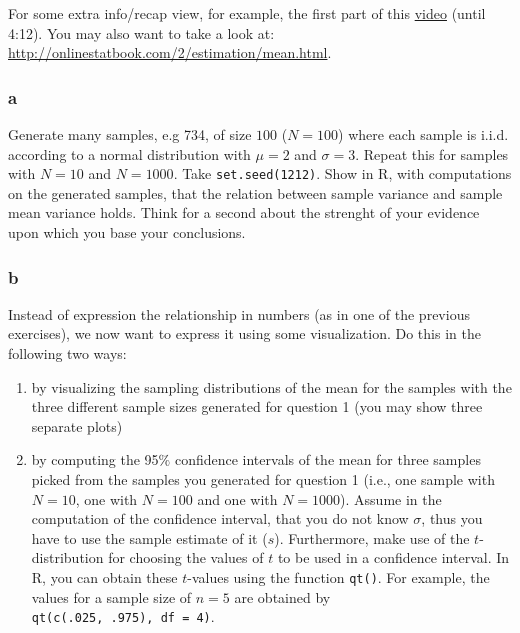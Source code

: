 \documentclass[]{article}
\providecommand{\tightlist}{%
  \setlength{\itemsep}{0pt}\setlength{\parskip}{0pt}}
\begin{document}
For some extra info/recap view, for example, the first part of this
\href{https://www.youtube.com/watch?v=q50GpTdFYyI}{video} (until 4:12).
You may also want to take a look at:
\url{http://onlinestatbook.com/2/estimation/mean.html}.

\hypertarget{a-6}{%
\subsubsection{a}\label{a-6}}

Generate many samples, e.g 734, of size \(100\) (\(N = 100\)) where each
sample is i.i.d. according to a normal distribution with \(\mu = 2\) and
\(\sigma = 3\). Repeat this for samples with \(N = 10\) and
\(N = 1000\). Take \texttt{set.seed(1212)}. Show in R, with computations
on the generated samples, that the relation between sample variance and
sample mean variance holds. Think for a second about the strenght of
your evidence upon which you base your conclusions.

\hypertarget{b-6}{%
\subsubsection{b}\label{b-6}}

Instead of expression the relationship in numbers (as in one of the
previous exercises), we now want to express it using some visualization.
Do this in the following two ways:

\begin{enumerate}
\def\labelenumi{\alph{enumi})}
\tightlist
\item
  by visualizing the sampling distributions of the mean for the samples
  with the three different sample sizes generated for question 1 (you
  may show three separate plots)
\item
  by computing the 95\(\%\) confidence intervals of the mean for three
  samples picked from the samples you generated for question 1 (i.e.,
  one sample with \(N = 10\), one with \(N = 100\) and one with
  \(N = 1000\)). Assume in the computation of the confidence interval,
  that you do not know \(\sigma\), thus you have to use the sample
  estimate of it (\(s\)). Furthermore, make use of the
  \(t\)-distribution for choosing the values of \(t\) to be used in a
  confidence interval. In R, you can obtain these \(t\)-values using the
  function \texttt{qt()}. For example, the values for a sample size of
  \(n = 5\) are obtained by \texttt{qt(c(.025,\ .975),\ df\ =\ 4)}.
\end{enumerate}
\end{document}
